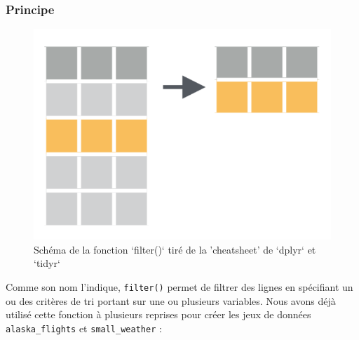 \documentclass[a4paperpaper,]{article}
\newenvironment{Shaded}{\begin{snugshade}}{\end{snugshade}}
\newcommand{\DecValTok}[1]{\textcolor[rgb]{0.69,0.50,0.00}{#1}}
\newcommand{\KeywordTok}[1]{\textcolor[rgb]{0.12,0.11,0.11}{\textbf{#1}}}
\newcommand{\NormalTok}[1]{\textcolor[rgb]{0.12,0.11,0.11}{#1}}
\newcommand{\OperatorTok}[1]{\textcolor[rgb]{0.12,0.11,0.11}{#1}}
\newcommand{\StringTok}[1]{\textcolor[rgb]{0.75,0.01,0.01}{#1}}
\theoremstyle{definition}
\theoremstyle{definition}
\theoremstyle{definition}
\theoremstyle{remark}
\begin{document}
\hypertarget{principe}{%
\subsubsection{Principe}\label{principe}}

\begin{figure}[htpb]

{\centering \includegraphics[width=0.5\linewidth]{images/filter} 

}

\caption{Schéma de la fonction `filter()` tiré de la 'cheatsheet' de `dplyr` et `tidyr`}\label{fig:filterfig}
\end{figure}

Comme son nom l'indique, \texttt{filter()} permet de filtrer des lignes
en spécifiant un ou des critères de tri portant sur une ou plusieurs
variables. Nous avons déjà utilisé cette fonction à plusieurs reprises
pour créer les jeux de données \texttt{alaska\_flights} et
\texttt{small\_weather} :

\begin{Shaded}
\end{Shaded}

\begin{Shaded}
\end{Shaded}
\end{document}
